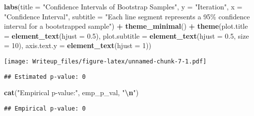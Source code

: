 \documentclass[
  11pt,
]{article}
\newenvironment{Shaded}{\begin{snugshade}}{\end{snugshade}}
\newcommand{\AttributeTok}[1]{\textcolor[rgb]{0.13,0.29,0.53}{#1}}
\newcommand{\DecValTok}[1]{\textcolor[rgb]{0.00,0.00,0.81}{#1}}
\newcommand{\FloatTok}[1]{\textcolor[rgb]{0.00,0.00,0.81}{#1}}
\newcommand{\FunctionTok}[1]{\textcolor[rgb]{0.13,0.29,0.53}{\textbf{#1}}}
\newcommand{\NormalTok}[1]{#1}
\newcommand{\OtherTok}[1]{\textcolor[rgb]{0.56,0.35,0.01}{#1}}
\newcommand{\SpecialCharTok}[1]{\textcolor[rgb]{0.81,0.36,0.00}{\textbf{#1}}}
\newcommand{\StringTok}[1]{\textcolor[rgb]{0.31,0.60,0.02}{#1}}
\begin{document}
\begin{Shaded}
\begin{Highlighting}[]
  \FunctionTok{labs}\NormalTok{(}\AttributeTok{title =} \StringTok{"Confidence Intervals of Bootstrap Samples"}\NormalTok{,}
       \AttributeTok{y =} \StringTok{"Iteration"}\NormalTok{,}
       \AttributeTok{x =} \StringTok{"Confidence Interval"}\NormalTok{,}
       \AttributeTok{subtitle =} \StringTok{"Each line segment represents a 95\% confidence interval for a bootstrapped sample"}\NormalTok{) }\SpecialCharTok{+}
  \FunctionTok{theme\_minimal}\NormalTok{() }\SpecialCharTok{+}
  \FunctionTok{theme}\NormalTok{(}\AttributeTok{plot.title =} \FunctionTok{element\_text}\NormalTok{(}\AttributeTok{hjust =} \FloatTok{0.5}\NormalTok{),}
        \AttributeTok{plot.subtitle =} \FunctionTok{element\_text}\NormalTok{(}\AttributeTok{hjust =} \FloatTok{0.5}\NormalTok{, }\AttributeTok{size =} \DecValTok{10}\NormalTok{),}
        \AttributeTok{axis.text.y =} \FunctionTok{element\_text}\NormalTok{(}\AttributeTok{hjust =} \DecValTok{1}\NormalTok{))}
\end{Highlighting}
\end{Shaded}

\texttt{[image: Writeup\_files/figure-latex/unnamed-chunk-7-1.pdf]}

\begin{Shaded}
\end{Shaded}

\begin{verbatim}
## Estimated p-value: 0
\end{verbatim}

\begin{Shaded}
\begin{Highlighting}[]
\FunctionTok{cat}\NormalTok{(}\StringTok{"Empirical p{-}value:"}\NormalTok{, emp\_p\_val, }\StringTok{"}\SpecialCharTok{\textbackslash{}n}\StringTok{"}\NormalTok{)}
\end{Highlighting}
\end{Shaded}

\begin{verbatim}
## Empirical p-value: 0
\end{verbatim}
\end{document}
